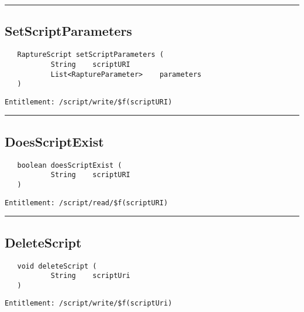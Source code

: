 \rule{12cm}{2pt}
\subsection{SetScriptParameters}
\label{Api:SetScriptParameters}
\begin{Verbatim}
   RaptureScript setScriptParameters (
           String    scriptURI
           List<RaptureParameter>    parameters
   )
\end{Verbatim}
\begin{Verbatim}[formatcom=\color{Maroon}]
  Entitlement: /script/write/$f(scriptURI)
\end{Verbatim}



\rule{12cm}{2pt}
\subsection{DoesScriptExist}
\label{Api:DoesScriptExist}
\begin{Verbatim}
   boolean doesScriptExist (
           String    scriptURI
   )
\end{Verbatim}
\begin{Verbatim}[formatcom=\color{Maroon}]
  Entitlement: /script/read/$f(scriptURI)
\end{Verbatim}



\rule{12cm}{2pt}
\subsection{DeleteScript}
\label{Api:DeleteScript}
\begin{Verbatim}
   void deleteScript (
           String    scriptUri
   )
\end{Verbatim}
\begin{Verbatim}[formatcom=\color{Maroon}]
  Entitlement: /script/write/$f(scriptUri)
\end{Verbatim}



